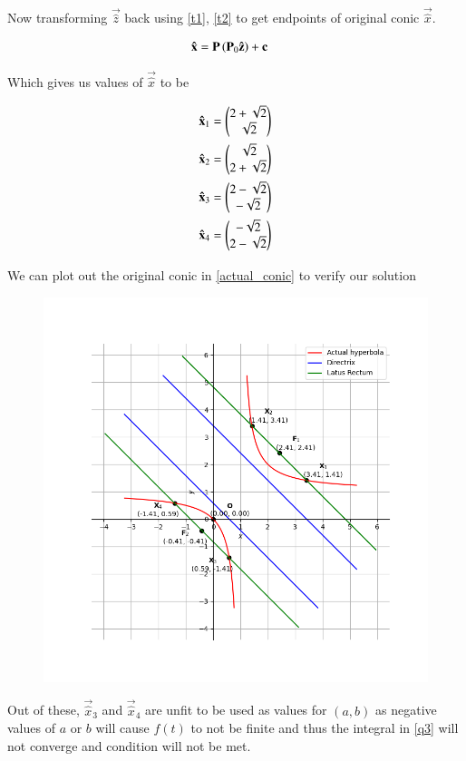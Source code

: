 \documentclass[journal]{IEEEtran}
\begin{document}
Now transforming $\vec{\hat{z}}$ back using \eqref{t1}, \eqref{t2} to get endpoints of original conic $\vec{\hat{x}}$.

\begin{align}
	\mathbf{\hat{x}} &= \mathbf{P}\left(\mathbf{P}_0 \mathbf{\hat{z}}\right) + \mathbf{c}
\end{align}

Which gives us values of $\vec{\hat{x}}$ to be

\begin{align*}
	\mathbf{\hat{x}}_1 &= \begin{pmatrix}2+\sqrt{2} \\ \sqrt{2}\end{pmatrix}\\
	\mathbf{\hat{x}}_2 &= \begin{pmatrix}\sqrt{2} \\ 2+\sqrt{2}\end{pmatrix}\\
	\mathbf{\hat{x}}_3 &= \begin{pmatrix}2-\sqrt{2} \\ -\sqrt{2}\end{pmatrix}\\
	\mathbf{\hat{x}}_4 &= \begin{pmatrix}-\sqrt{2} \\ 2-\sqrt{2}\end{pmatrix}
\end{align*}

We can plot out the original conic in \eqref{actual_conic} to verify our solution

\begin{figure}[H]
	\centering
	\includegraphics[width=0.75\columnwidth]{Figures/Hyperbola.png} 
	\caption{}
	\label{fig:Hyperbola}
\end{figure}

Out of these, $\vec{\hat{x}}_3$ and $\vec{\hat{x}}_4$ are unfit to be used as values for $(a, b)$ as negative values of $a$ or $b$ will cause $f(t)$ to not be finite and thus the integral in \eqref{q3} will not converge and condition will not be met.\\
\end{document}
